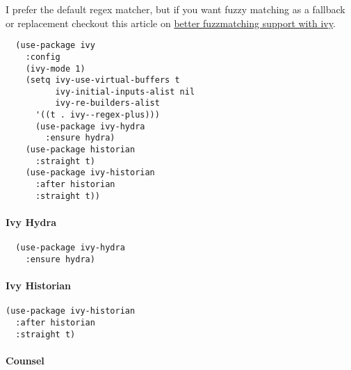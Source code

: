 \documentclass[11pt]{article}
\begin{document}
I prefer the default regex matcher, but if you want fuzzy matching as
a fallback or replacement checkout this article on \href{https://oremacs.com/2016/01/06/ivy-flx/}{better fuzzmatching
support with ivy}.

\begin{verbatim}
  (use-package ivy
    :config
    (ivy-mode 1)
    (setq ivy-use-virtual-buffers t
          ivy-initial-inputs-alist nil
          ivy-re-builders-alist
	  '((t . ivy--regex-plus)))
      (use-package ivy-hydra
        :ensure hydra)
    (use-package historian
      :straight t)
    (use-package ivy-historian
      :after historian
      :straight t))
\end{verbatim}

\paragraph*{Ivy Hydra}
\label{sec:orgcae516e}

\begin{verbatim}
  (use-package ivy-hydra
    :ensure hydra)
\end{verbatim}

\paragraph*{Ivy Historian}
\label{sec:org77ed887}

\begin{verbatim}
(use-package ivy-historian
  :after historian
  :straight t)
\end{verbatim}

\paragraph*{Counsel}
\label{sec:orgdcfacdd}
\end{document}
